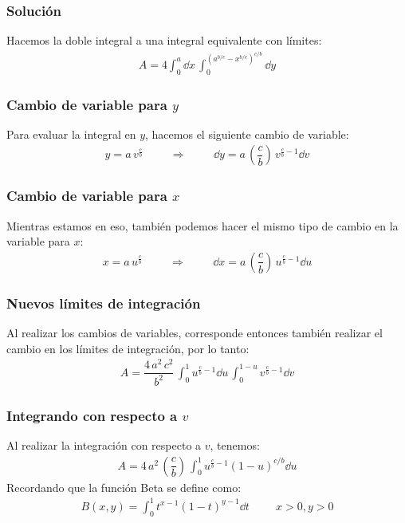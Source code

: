 \begin{frame}
\frametitle{Solución}
Hacemos la doble integral a una integral equivalente con límites:
\begin{align*}
A = 4 \int_{0}^{a} \dd{x} \, \int_{0}^{\left( a^{b/c} - x^{b/c} \right)^{c/b}} \dd{y}
\end{align*}
\end{frame}
\begin{frame}
\frametitle{Cambio de variable para $y$}
Para evaluar la integral en $y$, hacemos el siguiente cambio de variable:
\begin{align*}
y = a \, v^{\frac{c}{b}} \hspace{1cm} \Longrightarrow \hspace{1cm} \dd{y} = a \, \left( \dfrac{c}{b} \right) \, v^{\frac{c}{b} - 1} \dd{v}
\end{align*}
\end{frame}
\begin{frame}
\frametitle{Cambio de variable para $x$}
Mientras estamos en eso, también podemos hacer el mismo tipo de cambio en la variable para $x$:
\begin{align*}
x = a \, u^{\frac{c}{b}} \hspace{1cm} \Longrightarrow \hspace{1cm} \dd{x} = a \, \left( \dfrac{c}{b} \right) \, u^{\frac{c}{b} - 1} \dd{u}
\end{align*}
\end{frame}
\begin{frame}
\frametitle{Nuevos límites de integración}
Al realizar los cambios de variables, corresponde entonces también realizar el cambio en los límites de integración, por lo tanto:
\begin{align*}
A = \dfrac{4 \, a^{2} \, c^{2}}{b^{2}} \, \int_{0}^{1} u^{\frac{c}{b} - 1} \dd{u} \, \int_{0}^{1-u} v^{\frac{c}{b} - 1} \dd{v}
\end{align*}
\end{frame}
\begin{frame}
\frametitle{Integrando con respecto a $v$}
Al realizar la integración con respecto a $v$, tenemos:
\begin{align*}
A = 4 \, a^{2} \, \left( \dfrac{c}{b} \right) \, \int_{0}^{1} u^{\frac{c}{b} - 1} (1 - u)^{c/b} \dd{u}
\end{align*}
\pause
Recordando que la función Beta se define como:
\begin{align*}
B(x, y) = \int_{0}^{1} t^{x-1} (1 - t)^{y-1} \dd{t} \hspace{1cm} x > 0, y > 0
\end{align*}
\end{frame}
